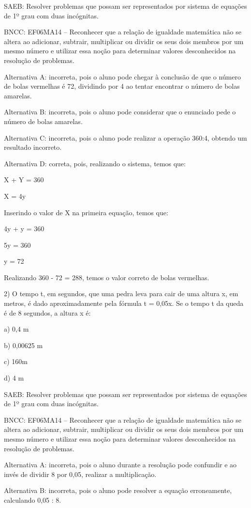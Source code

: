 SAEB: Resolver problemas que possam ser representados por sistema de
equações de 1º grau com duas incógnitas.

BNCC: EF06MA14 -- Reconhecer que a relação de igualdade matemática não
se altera ao adicionar, subtrair, multiplicar ou dividir os seus dois
membros por um mesmo número e utilizar essa noção para determinar
valores desconhecidos na resolução de problemas.

Alternativa A: incorreta, pois o aluno pode chegar à conclusão de que o
número de bolas vermelhas é 72, dividindo por 4 ao tentar encontrar o
número de bolas amarelas.

Alternativa B: incorreta, pois o aluno pode considerar que o enunciado
pede o número de bolas amarelas.

Alternativa C: incorreta, pois o aluno pode realizar a operação 360:4,
obtendo um resultado incorreto.

Alternativa D: correta, pois, realizando o sistema, temos que:

X + Y = 360

X = 4y

Inserindo o valor de X na primeira equação, temos que:

4y + y = 360

5y = 360

y = 72

Realizando 360 - 72 = 288, temos o valor correto de bolas vermelhas.

2) O tempo t, em segundos, que uma pedra leva para cair de uma altura x,
em metros, é dado aproximadamente pela fórmula t = 0,05x. Se o tempo t
da queda é de 8 segundos, a altura x é:

a) 0,4 m

b) 0,00625 m

c) 160m

d) 4 m

SAEB: Resolver problemas que possam ser representados por sistema de
equações de 1º grau com duas incógnitas.

BNCC: EF06MA14 -- Reconhecer que a relação de igualdade matemática não
se altera ao adicionar, subtrair, multiplicar ou dividir os seus dois
membros por um mesmo número e utilizar essa noção para determinar
valores desconhecidos na resolução de problemas.

Alternativa A: incorreta, pois o aluno durante a resolução pode
confundir e ao invés de dividir 8 por 0,05, realizar a multiplicação.

Alternativa B: incorreta, pois o aluno pode resolver a equação
erroneamente, calculando 0,05 : 8.


